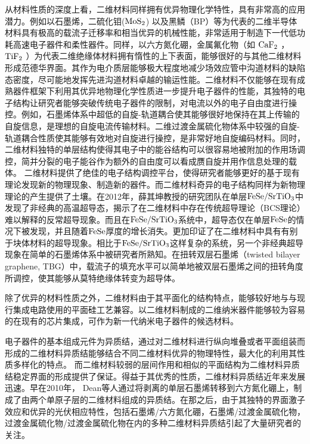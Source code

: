 从材料性质的深度上看，二维材料同样拥有优异物理化学特性，具有非常高的应用潜力。例如以石墨烯，二硫化钼($ \rm{MoS_{2}} $) 以及黑鳞（BP）等为代表的二维半导体材料具有极高的载流子迁移率和相当优异的机械性能，非常适用于制造下一代低功耗高速电子器件和柔性器件。同样，以六方氮化硼，金属氟化物（如 $ \rm{CaF_{2}} $ ， $\rm{TiF_{2}}$ ）为代表二维绝缘体材料拥有惰性的上下表面，能够很好的与其他二维材料形成范德华界面。其作为电介质层能够极大程度地减少场效应管中沟道材料的缺陷态密度，尽可能地发挥先进沟道材料卓越的输运性能。二维材料不仅能够在现有成熟器件框架下利用其优异地物理化学性质进一步提升电子器件的性能，其独特的电子结构让研究者能够突破传统电子器件的限制，对电流以外的电子自由度进行操控。例如，石墨烯体系中超低的自旋-轨道耦合使其能够很好地保持在其上传输的自旋信息，是理想的自旋电流传输材料。二维过渡金属硫化物体系中较强的自旋-轨道耦合性质使其能够有效地对自旋进行操控，是非常好地自旋编码材料。同时，二维材料独特的单层结构使得其电子中的能谷结构可以很容易地被附加的作用场调控，简并分裂的电子能谷作为额外的自由度可以看成赝自旋并用作信息处理的载体。
二维材料提供了绝佳的电子结构调控平台，使得研究者能够更好的基于现有理论发现新的物理现象、制造新的器件。而二维材料奇异的电子结构同样为新物理理论的产生提供了土壤。在2012年，薛其坤教授的研究团队在单层$\rm{FeSe/SrTiO_{3}}$中发现了非经典的高温超导态，揭示了在二维材料中存在传统超导理论（BCS理论）难以解释的反常超导现象。而且在$\rm{FeSe/SrTiO_{3}}$系统中，超导态仅在单层$\rm{FeSe}$的情况下被发现，并且随着$\rm{FeSe}$厚度的增长消失。更加印证了在二维材料中具有有别于块体材料的超导现象。相比于$\rm{FeSe/SrTiO_{3}}$这样复杂的系统，另一个非经典超导现象在简单的石墨烯体系中被研究者所熟知。在扭转双层石墨烯（twisted bilayer graphene, TBG）中，载流子的填充水平可以简单地被双层石墨烯之间的扭转角度所调控，使其能够从莫特绝缘体转变为超导体。

除了优异的材料性质之外，二维材料由于其平面化的结构特点，能够较好地与与现行集成电路使用的平面硅工艺兼容。以二维材料制成的二维纳米器件能够较为容易的在现有的芯片集成，可作为新一代纳米电子器件的候选材料。

电子器件的基本组成元件为异质结，通过对二维材料进行纵向堆叠或者平面组装而形成的二维材料异质结能够结合不同二维材料优异的物理特性，最大化的利用其性质多样化的特点。 而二维材料较弱的层间作用和相似的平面结构为二维材料异质结稳定界面的形成提供了保证。得益于其优秀的性质，二维材料异质结近年来发展迅速。早在2010年， Dean等人通过将剥离的单层石墨烯转移到六方氮化硼上，制成了由两个单原子层的二维材料组成的异质结。在那之后，由于其独特的界面激子效应和优异的光伏相应特性，包括石墨烯/六方氮化硼，石墨烯/过渡金属硫化物，过渡金属硫化物/过渡金属硫化物在内的多种二维材料异质结引起了大量研究者的关注。

